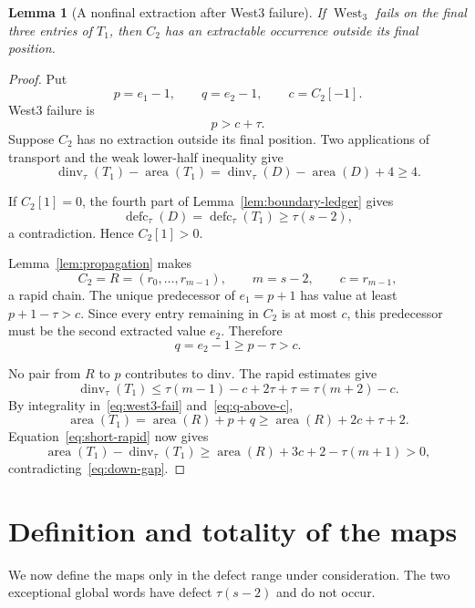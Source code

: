 \documentclass[11pt]{article}
\newtheorem{lemma}[theorem]{Lemma}
\theoremstyle{definition}
\theoremstyle{remark}
\newcommand{\area}{\operatorname{area}}
\newcommand{\dinv}{\operatorname{dinv}}
\newcommand{\defc}{\operatorname{defc}}
\newcommand{\West}{\operatorname{West}}
\begin{document}
\begin{lemma}[A nonfinal extraction after West3 failure]
\label{lem:down-third-position}
If $\West_3$ fails on the final three entries of $T_1$, then $C_2$ has an
extractable occurrence outside its final position.
\end{lemma}

\begin{proof}
Put
\[
  p=e_1-1,
  \qquad q=e_2-1,
  \qquad c=C_2[-1].
\]
West3 failure is
\begin{equation}
  p>c+\tau.
  \label{eq:west3-fail}
\end{equation}
Suppose $C_2$ has no extraction outside its final position.  Two applications
of transport and the weak lower-half inequality give
\begin{equation}
  \dinv_\tau(T_1)-\area(T_1)
  =\dinv_\tau(D)-\area(D)+4\ge4.
  \label{eq:down-gap}
\end{equation}

If $C_2[1]=0$, the fourth part of Lemma~\ref{lem:boundary-ledger} gives
\[
  \defc_\tau(D)=\defc_\tau(T_1)\ge\tau(s-2),
\]
a contradiction.  Hence $C_2[1]>0$.

Lemma~\ref{lem:propagation} makes
\[
  C_2=R=(r_0,\ldots,r_{m-1}),
  \qquad m=s-2,
  \qquad c=r_{m-1},
\]
a rapid chain.  The unique predecessor of $e_1=p+1$ has value at least
$p+1-\tau>c$.  Since every entry remaining in $C_2$ is at most $c$, this
predecessor must be the second extracted value $e_2$.  Therefore
\begin{equation}
  q=e_2-1\ge p-\tau>c.
  \label{eq:q-above-c}
\end{equation}

No pair from $R$ to $p$ contributes to dinv.  The rapid estimates give
\[
 \dinv_\tau(T_1)
 \le\tau(m-1)-c+2\tau+\tau
 =\tau(m+2)-c.
\]
By integrality in~\eqref{eq:west3-fail} and~\eqref{eq:q-above-c},
\[
 \area(T_1)=\area(R)+p+q
 \ge\area(R)+2c+\tau+2.
\]
Equation~\eqref{eq:short-rapid} now gives
\[
 \area(T_1)-\dinv_\tau(T_1)
 \ge\area(R)+3c+2-\tau(m+1)>0,
\]
contradicting~\eqref{eq:down-gap}.
\end{proof}

\section{Definition and totality of the maps}

We now define the maps only in the defect range under consideration.  The
two exceptional global words have defect $\tau(s-2)$ and do not occur.
\end{document}
